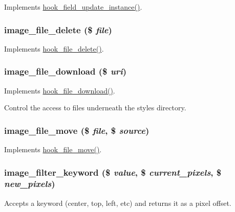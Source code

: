 \label{image_8module_a3ee06b052a9a2a8372874966c24fbca7}
Implements \hyperlink{group__field__crud_gadac9cbd13f55714dbf8fc2a98227f6e3}{hook\_\-field\_\-update\_\-instance()}. \hypertarget{image_8module_a3e93edb08d958010616bc0d594558470}{
\subsubsection[{image\_\-file\_\-delete}]{\setlength{\rightskip}{0pt plus 5cm}image\_\-file\_\-delete (\$ {\em file})}}
\label{image_8module_a3e93edb08d958010616bc0d594558470}
Implements \hyperlink{group__hooks_gafa88683ad014451b3fbc9ca9bb80afdd}{hook\_\-file\_\-delete()}. \hypertarget{image_8module_a7b239d6ba682f11002687acf636474ec}{
\subsubsection[{image\_\-file\_\-download}]{\setlength{\rightskip}{0pt plus 5cm}image\_\-file\_\-download (\$ {\em uri})}}
\label{image_8module_a7b239d6ba682f11002687acf636474ec}
Implements \hyperlink{group__hooks_gab73f0e658d6630220ba7836ccd011ecc}{hook\_\-file\_\-download()}.

Control the access to files underneath the styles directory. \hypertarget{image_8module_a27cd817c67a0dea086228c8466ffe213}{
\subsubsection[{image\_\-file\_\-move}]{\setlength{\rightskip}{0pt plus 5cm}image\_\-file\_\-move (\$ {\em file}, \/  \$ {\em source})}}
\label{image_8module_a27cd817c67a0dea086228c8466ffe213}
Implements \hyperlink{group__hooks_ga7053514a7a923b43960b31cacfa9ce95}{hook\_\-file\_\-move()}. \hypertarget{image_8module_a4d9e07c3779bccf249a6d294778b9b41}{
\subsubsection[{image\_\-filter\_\-keyword}]{\setlength{\rightskip}{0pt plus 5cm}image\_\-filter\_\-keyword (\$ {\em value}, \/  \$ {\em current\_\-pixels}, \/  \$ {\em new\_\-pixels})}}
\label{image_8module_a4d9e07c3779bccf249a6d294778b9b41}
Accepts a keyword (center, top, left, etc) and returns it as a pixel offset.


